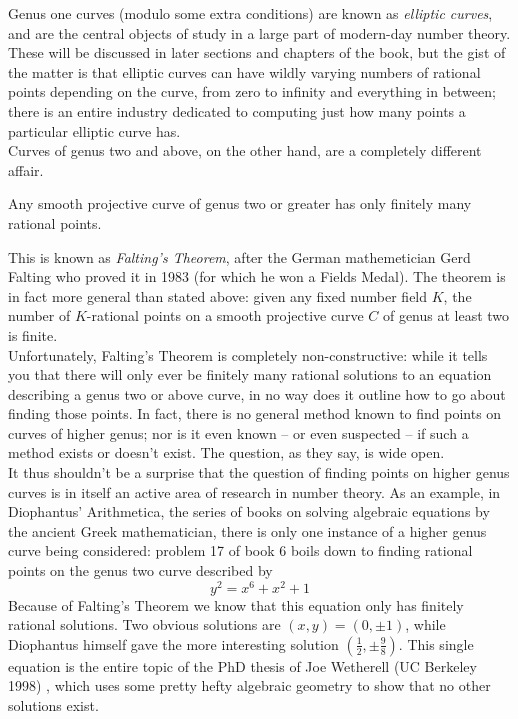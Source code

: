 \documentclass{book}
\begin{document}
Genus one curves (modulo some extra conditions) are
known as {\it elliptic curves}, and are the central
objects of study in a large part of modern-day number
theory. These will be discussed in later sections and
chapters of the book, but the gist of the matter is
that elliptic curves can have wildly varying numbers
of rational points depending on the curve, from zero
to infinity and everything in between; there is an
entire industry dedicated to computing just how many
points a particular elliptic curve has. \\

Curves of genus two and above, on the other hand, are
a completely different affair.

\begin{theorem}
Any smooth projective curve of genus two or greater
has only finitely many rational points.
\end{theorem}

This is known as {\it Falting's Theorem}, after the
German mathemetician Gerd Falting who proved it in
1983 (for which he won a Fields Medal). The theorem
is in fact more general than stated above: given any
fixed number field $K$, the number of $K$-rational
points on a smooth projective curve $C$ of genus at
least two is finite. \\

Unfortunately, Falting's Theorem is completely non-constructive:
while it tells you that there will only ever be
finitely many rational solutions to an equation
describing a genus two or above curve, in no way does
it outline how to go about finding those points. In
fact, there is no general method known to find points
on curves of higher genus; nor is it even known -- or
even suspected -- if such a method exists or doesn't
exist. The question, as they say, is wide open. \\

It thus shouldn't be a surprise that the question of
finding points on higher genus curves is in itself an
active area of research in number theory. As an
example, in Diophantus' Arithmetica, the series of
books on solving algebraic equations by the ancient
Greek mathematician, there is only one instance of a
higher genus curve being considered: problem 17 of
book 6 boils down to finding rational points on the
genus two curve described by
\[ y^2 = x^6 + x^2 + 1 \]
Because of Falting's Theorem we know that this
equation only has finitely rational solutions. Two
obvious solutions are $(x,y) = (0,\pm 1)$, while
Diophantus himself gave the more interesting solution
$(\frac{1}{2},\pm \frac{9}{8})$. This single equation
is the entire topic of the PhD thesis of Joe
Wetherell (UC Berkeley 1998) \cite{wetherell1997bounding}, which uses some pretty
hefty algebraic geometry to show that no other
solutions exist. \\
\end{document}
